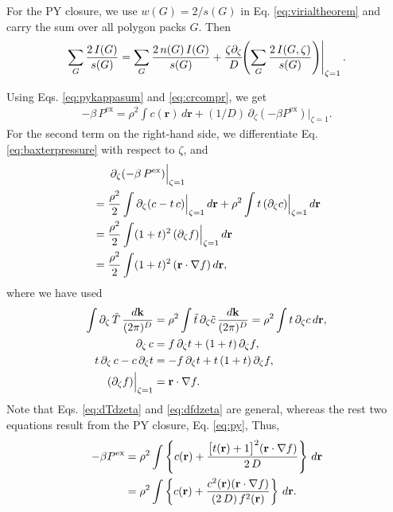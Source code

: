 \documentclass[preprint]{revtex4-1}
\newcommand{\vct}[1]{\mathbf{#1}}
\providecommand{\vr}{} %
\renewcommand{\vr}{\vct{r}}
\newcommand{\vk}{\vct{k}}
\newcommand{\dvk}{\frac{d\vk}{(2\pi)^D}}
\newcommand{\supex}[1]{ { { #1 }^{ \mathrm{ex} } } }
\newcommand{\Pex}{\supex{P}}
\begin{document}
For the PY closure, we use $w(G) = 2/s(G)$
in Eq. \eqref{eq:virialtheorem}
and carry the sum over all polygon packs $G$.
%
Then
%
\begin{align*}
  \sum_G \frac{ 2 \, I(G) } { s(G) }
  =
  \sum_G \frac{ 2 \, n(G) \, I(G) } { s(G) }
  + \frac{ \zeta \partial_\zeta }{ D }
    \mkern-8mu \left. \left(
    \sum_G \frac{ 2 \, I(G, \zeta) } { s(G) }
    \right) \right|_{\zeta = 1}.
\end{align*}


Using Eqs. \eqref{eq:pykappasum} and \eqref{eq:crcompr}, we get
\begin{align}
  -\beta \, \Pex
  =
  \rho^2 \int c(\vr) \, d\vr
  + (1/D) \,
      \partial_\zeta \left( -\beta \Pex \right)
    \Big|_{\zeta = 1}.
\label{eq:pyPsimp1}
\end{align}
%
For the second term on the right-hand side,
we differentiate Eq. \eqref{eq:baxterpressure} with respect to $\zeta$,
and
\begin{align*}
&\hphantom{==}
\partial_\zeta (-\beta \, \Pex) \Big|_{\zeta=1}
\\
&=
\frac{\rho^2}{2}
\int
  \partial_\zeta (c - t \, c)
  \Big|_{\zeta = 1} \, d\vr
+ \rho^2 \int t \, (\partial_\zeta c) \Big|_{\zeta = 1} \, d\vr
\\
&=
\frac{\rho^2}{2}
\int (1+t)^2 \, (\partial_\zeta f) \Big|_{\zeta = 1} \, d\vr
\\
&=
\frac{\rho^2}{2}
\int (1+t)^2 \, (\vr \cdot \nabla f) \, d\vr,
\end{align*}
%
where we have used
\begin{align}
%
\int \partial_\zeta \, \tilde T \, \dvk
&=
  \rho^2 \int \tilde{t} \, \partial_\zeta \tilde{c} \, \dvk
=
  \rho^2 \int t \, \partial_\zeta c \, d\vr,
  \label{eq:dTdzeta} \\
%
  \partial_\zeta \, c
&=
  f \, \partial_\zeta t
  + (1 + t) \, \partial_\zeta f,
  \notag \\
%
  t \, \partial_\zeta \, c - c \, \partial_\zeta t
&=
  -f \, \partial_\zeta t
  + t \, (1 + t) \, \partial_\zeta f,
  \notag \\
%
  (\partial_\zeta f) \Big|_{\zeta = 1}
&= \vr \cdot \nabla f.
  \label{eq:dfdzeta}
\end{align}
%
Note that Eqs. \eqref{eq:dTdzeta} and \eqref{eq:dfdzeta} are general,
whereas the rest two equations result from the PY closure, Eq. \eqref{eq:py},
%
Thus,
\begin{align}
  -\beta \Pex
&=
  \rho^2 \int
  \left\{ c(\vr)
    + \frac{ \big[ t(\vr) + 1 \big]^2 (\vr \cdot \nabla f) }
           { 2 \, D }
  \right\} \, d\vr
  \label{eq:pyPsimplified}
\\
&=
  \rho^2 \int
  \left\{ c(\vr)
  + \frac{ c^2(\vr) (\vr \cdot \nabla f) }
    { (2 \, D) \, f^2(\vr) }
  \right\} \, d\vr.
  \notag
\end{align}
\end{document}
